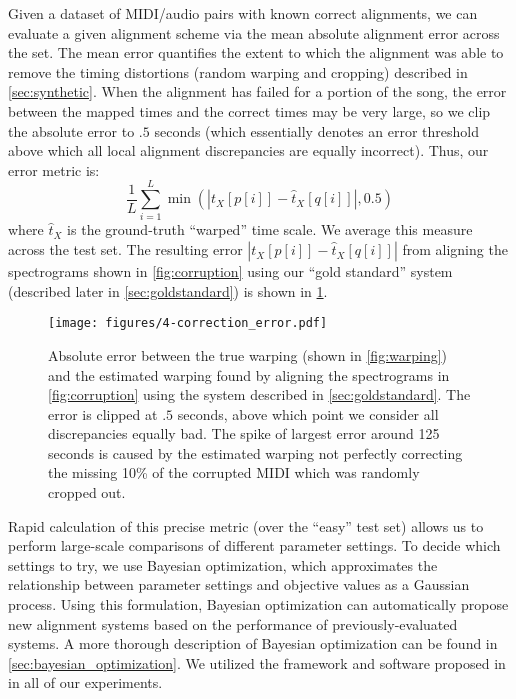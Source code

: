 Given a dataset of MIDI/audio pairs with known correct alignments, we can evaluate a given alignment scheme via the mean absolute alignment error across the set.
The mean error quantifies the extent to which the alignment was able to remove the timing distortions (random warping and cropping) described in \cref{sec:synthetic}.
When the alignment has failed for a portion of the song, the error between the mapped times and the correct times may be very large, so we clip the absolute error to $.5$ seconds (which essentially denotes an error threshold above which all local alignment discrepancies are equally incorrect).  Thus, our error metric is:
\begin{equation}
\frac{1}{L}\sum_{i = 1}^{L} \min(|t_X[p[i]] - \hat{t}_X[q[i]]|, 0.5)
\end{equation}
where $\hat{t}_X$ is the ground-truth ``warped'' time scale.  We average this measure across the test set.
The resulting error $|t_X[p[i]] - \hat{t}_X[q[i]]|$ from aligning the spectrograms shown in \cref{fig:corruption} using our ``gold standard'' system (described later in \cref{sec:goldstandard}) is shown in \cref{fig:correction_error}.

\begin{figure}
  \centering
  \texttt{[image: figures/4-correction\_error.pdf]}
  \caption[Absolute error from correcting synthetic warping]{Absolute error between the true warping (shown in \cref{fig:warping}) and the estimated warping found by aligning the spectrograms in \cref{fig:corruption} using the system described in \cref{sec:goldstandard}.
The error is clipped at $.5$ seconds, above which point we consider all discrepancies equally bad.
The spike of largest error around 125 seconds is caused by the estimated warping not perfectly correcting the missing 10\% of the corrupted MIDI which was randomly cropped out.}
  \label{fig:correction_error}
\end{figure}

Rapid calculation of this precise metric (over the ``easy'' test set) allows us to perform large-scale comparisons of different parameter settings.
To decide which settings to try, we use Bayesian optimization, which approximates the relationship between parameter settings and objective values as a Gaussian process.
Using this formulation, Bayesian optimization can automatically propose new alignment systems based on the performance of previously-evaluated systems.
A more thorough description of Bayesian optimization can be found in \cref{sec:bayesian_optimization}.
We utilized the framework and software proposed in \cite{snoek2012practical} in all of our experiments.

